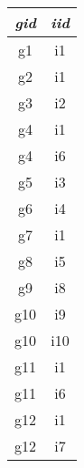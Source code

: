 \begin{tabular}{|c|c|}
\hline
 \textit{gid}  & \textit{iid} \\
\hline
 g1   & i1\\
 g2   & i1\\
 g3   & i2\\
 g4   & i1\\
 g4   & i6\\
 g5   & i3\\
 g6   & i4\\
 g7   & i1\\
 g8   & i5\\
 g9   & i8\\
 g10  & i9\\
 g10  & i10\\
 g11  & i1\\
 g11  & i6\\
 g12  & i1\\
 g12  & i7\\
\hline
\end{tabular}
